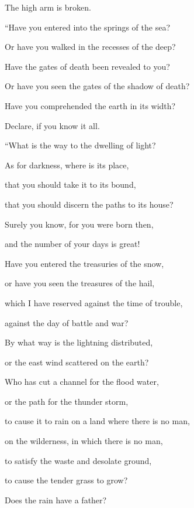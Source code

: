 {\par }{\QB The high arm is broken.
\par }{\BB \par }{\Q {}“Have you entered into the springs of the sea?
\par }{\QB Or have you walked in the recesses of the deep?
\par }{\Q {}Have the gates of death been revealed to you?
\par }{\QB Or have you seen the gates of the shadow of death?
\par }{\Q {}Have you comprehended the earth in its width?
\par }{\QB Declare, if you know it all.
\par }{\BB \par }{\Q {}“What is the way to the dwelling of light?
\par }{\QB As for darkness, where is its place,
\par }{\Q {}that you should take it to its bound,
\par }{\QB that you should discern the paths to its house?
\par }{\Q {}Surely you know, for you were born then,
\par }{\QB and the number of your days is great!
\par }{\Q {}Have you entered the treasuries of the snow,
\par }{\QB or have you seen the treasures of the hail,
\par }{\Q {}which I have reserved against the time of trouble,
\par }{\QB against the day of battle and war?
\par }{\Q {}By what way is the lightning distributed,
\par }{\QB or the east wind scattered on the earth?
\par }{\BB \par }{\Q {}Who has cut a channel for the flood water,
\par }{\QB or the path for the thunder storm,
\par }{\Q {}to cause it to rain on a land where there is no man,
\par }{\QB on the wilderness, in which there is no man,
\par }{\Q {}to satisfy the waste and desolate ground,
\par }{\QB to cause the tender grass to grow?
\par }{\Q {}Does the rain have a father?
}
